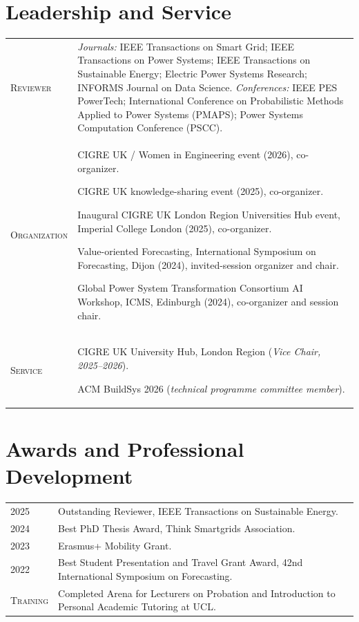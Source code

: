 \documentclass[11pt,a4paper]{article}
\makeatletter
\newlength{\datecolwidth}
\newenvironment{entrylist}{%
  \begin{longtable}{@{}p{\datecolwidth}@{\hspace{0.8em}}p{\dimexpr\linewidth-\datecolwidth-0.8em\relax}@{}}%
}{\end{longtable}}
\newcommand{\labelstyle}[1]{\textsc{#1}}   %
\newcommand{\entrylabel}[2]{%
  \labelstyle{#1} & #2\\[0.8em]
}
\makeatother
\begin{document}
\section*{Leadership and Service}
\begin{entrylist}
  \entrylabel{Reviewer}{%
    \emph{Journals:} IEEE Transactions on Smart Grid; IEEE Transactions on Power Systems; IEEE Transactions on Sustainable Energy; Electric Power Systems Research; INFORMS Journal on Data Science.
    \emph{Conferences:} IEEE PES PowerTech; International Conference on Probabilistic Methods Applied to Power Systems
(PMAPS); Power Systems Computation Conference (PSCC).
  }

  \entrylabel{Organization}{
    CIGRE UK / Women in Engineering event (2026), co-organizer.

    CIGRE UK knowledge-sharing event (2025), co-organizer.

    Inaugural CIGRE UK London Region Universities Hub event, Imperial College London (2025), co-organizer.

    Value-oriented Forecasting, International Symposium on Forecasting, Dijon (2024), invited-session organizer and chair.

    Global Power System Transformation Consortium AI Workshop, ICMS, Edinburgh (2024), co-organizer and session chair.
  }

  \entrylabel{Service}{

  CIGRE UK University Hub, London Region (\emph{Vice Chair, 2025--2026}).

  ACM BuildSys 2026 (\emph{technical programme committee member}).

  }

\end{entrylist}


\newpage
\section*{Awards and Professional Development}
\begin{entrylist}
  \entrylabel{2025}{Outstanding Reviewer, IEEE Transactions on Sustainable Energy.}
  \entrylabel{2024}{Best PhD Thesis Award, Think Smartgrids Association.}
  \entrylabel{2023}{Erasmus+ Mobility Grant.}
  \entrylabel{2022}{Best Student Presentation and Travel Grant Award, 42nd International Symposium on Forecasting.}
  \entrylabel{Training}{Completed Arena for Lecturers on Probation and Introduction to Personal Academic Tutoring at UCL.}
\end{entrylist}
\end{document}

